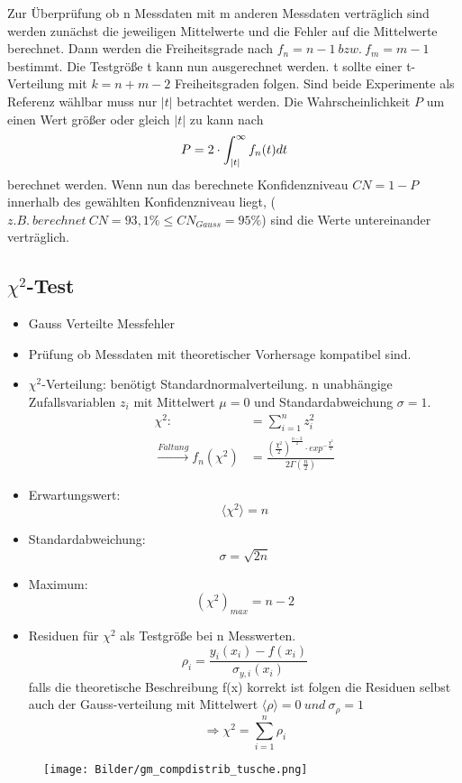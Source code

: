 \documentclass[10pt,a4paper]{article}
\begin{document}
\begin{itemize}
\begin{itemize}
Zur Überprüfung ob n Messdaten mit m anderen Messdaten verträglich sind werden zunächst die jeweiligen Mittelwerte und die Fehler auf die Mittelwerte berechnet. Dann werden die Freiheitsgrade nach $f_n=n-1 ~bzw.~ f_m=m-1$ bestimmt. Die Testgröße t kann nun ausgerechnet werden. t sollte einer t-Verteilung mit $k=n+m-2$ Freiheitsgraden folgen. Sind beide Experimente als Referenz wählbar muss nur $|t|$ betrachtet werden. Die Wahrscheinlichkeit $P$ um einen Wert größer oder gleich $|t|$ zu kann nach 
\begin{equation}
P=2\cdot\int^{\infty}_{|t|}f_n(t)dt \notag
\end{equation} 
berechnet werden. Wenn nun das berechnete Konfidenzniveau $CN=1-P$ innerhalb des gewählten Konfidenzniveau liegt, ($z.B.~ berechnet ~ CN=93,1\%\le CN_{Gauss}=95\%$) sind die Werte untereinander verträglich.
\end{itemize}
\end{itemize}

\newpage
\subsection{$\chi^2$-Test}
\begin{itemize}
\item Gauss Verteilte Messfehler
\item Prüfung ob Messdaten mit theoretischer Vorhersage kompatibel sind.

\item $\chi^2$-Verteilung: benötigt Standardnormalverteilung. n unabhängige Zufallsvariablen $z_i$ mit Mittelwert $\mu=0$ und Standardabweichung $\sigma=1$.
\begin{align}
\chi^2:&=\sum^{n}_{i=1}{z^2_i} \\
\stackrel{Faltung}{\rightarrow} f_n(\chi^2)&=\frac{(\frac{\chi^2}{2})^{\frac{n-2}{2}}\cdot exp^{-\frac{\chi^2}{2}}}{2\Gamma(\frac{n}{2})} 
\end{align}
\item Erwartungswert:
\begin{equation}
\langle \chi^2 \rangle =n
\end{equation}
\item Standardabweichung:
\begin{equation}
\sigma=\sqrt{2n}
\end{equation}
\item Maximum:
\begin{equation}
(\chi^2)_{max}=n-2
\end{equation}
\item Residuen für $\chi^2$ als Testgröße bei n Messwerten.
\begin{equation}
\rho_i=\frac{y_i(x_i)-f(x_i)}{\sigma_{y,i}(x_i)}
\end{equation}
falls die theoretische Beschreibung f(x) korrekt ist folgen die Residuen selbst auch der Gauss-verteilung mit Mittelwert $\langle \rho \rangle=0 ~ \textit{und} ~ \sigma_{\rho}=1$
\begin{equation}
\Rightarrow \chi^2=\sum^{n}_{i=1}\rho_i
\end{equation}
\end{itemize}


\begin{figure}[hbtp]
\centering
\texttt{[image: Bilder/gm\_compdistrib\_tusche.png]}
\end{figure}
\end{document}
